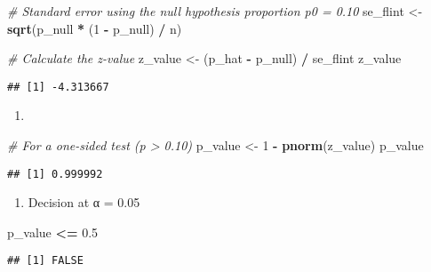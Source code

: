 \documentclass[
]{article}
\newenvironment{Shaded}{\begin{snugshade}}{\end{snugshade}}
\newcommand{\CommentTok}[1]{\textcolor[rgb]{0.56,0.35,0.01}{\textit{#1}}}
\newcommand{\DecValTok}[1]{\textcolor[rgb]{0.00,0.00,0.81}{#1}}
\newcommand{\FloatTok}[1]{\textcolor[rgb]{0.00,0.00,0.81}{#1}}
\newcommand{\FunctionTok}[1]{\textcolor[rgb]{0.13,0.29,0.53}{\textbf{#1}}}
\newcommand{\NormalTok}[1]{#1}
\newcommand{\OtherTok}[1]{\textcolor[rgb]{0.56,0.35,0.01}{#1}}
\newcommand{\SpecialCharTok}[1]{\textcolor[rgb]{0.81,0.36,0.00}{\textbf{#1}}}
\providecommand{\tightlist}{%
  \setlength{\itemsep}{0pt}\setlength{\parskip}{0pt}}
\begin{document}
\begin{Shaded}
\begin{Highlighting}[]
\CommentTok{\# Standard error using the null hypothesis proportion p0 = 0.10}
\NormalTok{se\_flint }\OtherTok{\textless{}{-}} \FunctionTok{sqrt}\NormalTok{(p\_null }\SpecialCharTok{*}\NormalTok{ (}\DecValTok{1} \SpecialCharTok{{-}}\NormalTok{ p\_null) }\SpecialCharTok{/}\NormalTok{ n)}

\CommentTok{\# Calculate the z{-}value}
\NormalTok{z\_value }\OtherTok{\textless{}{-}}\NormalTok{ (p\_hat }\SpecialCharTok{{-}}\NormalTok{ p\_null) }\SpecialCharTok{/}\NormalTok{ se\_flint}
\NormalTok{z\_value}
\end{Highlighting}
\end{Shaded}

\begin{verbatim}
## [1] -4.313667
\end{verbatim}

\begin{enumerate}
\def\labelenumi{(\alph{enumi})}
\setcounter{enumi}{3}
\tightlist
\item
\end{enumerate}

\begin{Shaded}
\begin{Highlighting}[]
\CommentTok{\# For a one{-}sided test (p \textgreater{} 0.10)}
\NormalTok{p\_value }\OtherTok{\textless{}{-}} \DecValTok{1} \SpecialCharTok{{-}} \FunctionTok{pnorm}\NormalTok{(z\_value)}
\NormalTok{p\_value}
\end{Highlighting}
\end{Shaded}

\begin{verbatim}
## [1] 0.999992
\end{verbatim}

\begin{enumerate}
\def\labelenumi{(\alph{enumi})}
\setcounter{enumi}{4}
\tightlist
\item
  Decision at α = 0.05
\end{enumerate}

\begin{Shaded}
\begin{Highlighting}[]
\NormalTok{p\_value }\SpecialCharTok{\textless{}=} \FloatTok{0.5}
\end{Highlighting}
\end{Shaded}

\begin{verbatim}
## [1] FALSE
\end{verbatim}
\end{document}
